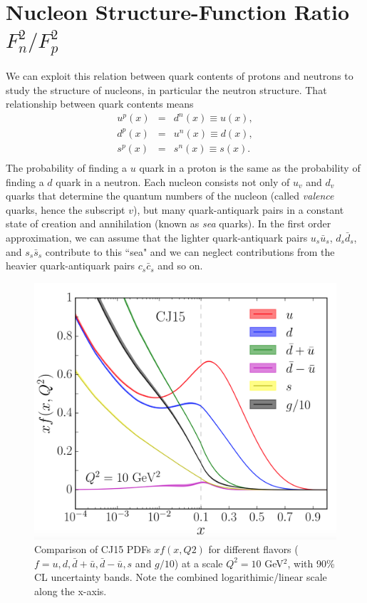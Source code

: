 \section{Nucleon Structure-Function Ratio $F^2_n/F^2_p$}
We can exploit this relation between quark contents of protons and neutrons to study the structure of nucleons, in particular the neutron structure. That relationship between quark contents means
\begin{eqnarray}
\nonumber
u^p(x) &=& d^n(x) \equiv u(x), \\
d^p(x) &=& u^n(x) \equiv d(x), \\
\nonumber
s^p(x) &=& s^n(x) \equiv s(x). \\
\end{eqnarray}
The probability of finding a $u$ quark in a proton is the same as the probability of finding a $d$ quark in a neutron. Each nucleon consists not only of $u_v$ and $d_v$ quarks that determine the quantum numbers of the nucleon (called \textit{valence} quarks, hence the subscript $v$), but many quark-antiquark pairs in a constant state of creation and annihilation (known as \textit{sea} quarks). In the first order approximation, we can assume that the lighter quark-antiquark pairs $u_s\bar{u}_s$, $d_s\bar{d}_s$, and $s_s\bar{s}_s$ contribute to this ``sea" and we can neglect contributions from the heavier quark-antiquark pairs $c_s\bar{c}_s$ and so on.

\begin{figure}[h!]
	\centering
	\includegraphics[width=0.9\linewidth]{figures/xf_x.png}
	\caption{Comparison of CJ15 PDFs $xf(x,Q2)$ for different flavors ($f = u, d, \bar{d}+\bar{u}, \bar{d}−\bar{u}, s$ and $g/10$) at a scale $Q^2 = 10$ GeV$^2$, with 90\% CL uncertainty bands. Note the combined logarithimic/linear scale along the x-axis.\cite{CJ15}}
	\label{fig:xf_x}
\end{figure}


